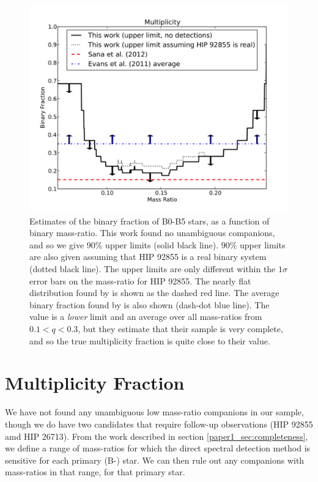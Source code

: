 \begin{figure}[t]
  \centering
  \includegraphics[width=\columnwidth]{Figures/paper1_fig7.pdf}
  \caption{Estimates of the binary fraction of B0-B5 stars,
    as a function of binary mass-ratio. This work found no unambiguous companions,
    and so we give $90\%$ upper limits (solid black line). $90\%$
    upper limits are also given assuming that HIP 92855 is a real
    binary system (dotted black line). The upper limits are only different within the
    $1\sigma$ error bars on the mass-ratio for HIP 92855. The nearly flat 
    distribution found by \cite{Sana2012} is shown as the dashed red line. The average binary 
    fraction found by \cite{Evans2011} is also shown (dash-dot blue line). The
    \cite{Evans2011} value is a \emph{lower} limit and an average over all mass-ratios from $0.1 < q < 0.3$, but they estimate
    that their sample is very complete, and so the true multiplicity fraction is quite close to their value.}
  \label{paper1_fig:limits}
\end{figure}


\section{Multiplicity Fraction}
\label{paper1_sec:multiplicity}

We have not found any unambiguous low mass-ratio companions in our
sample, though we do have two candidates that require follow-up
observations (HIP 92855 amd HIP 26713). From the work described in section
\ref{paper1_sec:completeness}, we define a range
of mass-ratios for which the direct spectral detection method is
sensitive for each primary (B-) star. We can then rule out any
companions with mass-ratios in that range, for that primary star.

